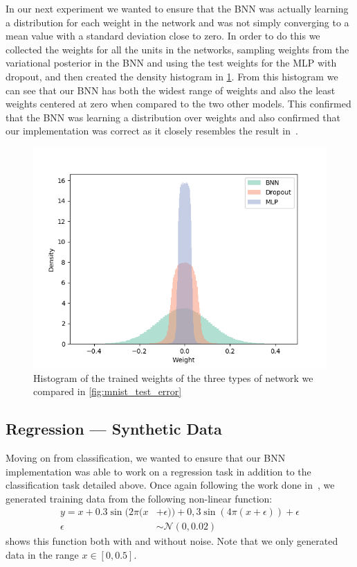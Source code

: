 \documentclass[11pt]{article}
\begin{document}
In our next experiment we wanted to ensure that the BNN was actually learning
a distribution for each weight in the network and was not simply converging to
a mean value with a standard deviation close to zero. In order to do this we
collected the weights for all the units in the networks, sampling weights from
the variational posterior in the BNN and using the test weights for the MLP
with dropout, and then created the density histogram in
\cref{fig:mnist_weight_density}. From this histogram we can see that our BNN
has both the widest range of weights and also the least weights centered at
zero when compared to the two other models. This confirmed that the BNN was
learning a distribution over weights and also confirmed that our implementation
was correct as it closely resembles the result in~\cite{blundell}.

\begin{figure}
  \centering
  \includegraphics[width=.6\textwidth]{figures/weight_density_compare.png}
  \caption{Histogram of the trained weights of the three types of network we
  compared in \cref{fig:mnist_test_error}}\label{fig:mnist_weight_density}
\end{figure}

\subsection{Regression --- Synthetic Data}

Moving on from classification, we wanted to ensure that our BNN implementation
was able to work on a regression task in addition to the classification task
detailed above. Once again following the work done in~\cite{blundell}, we
generated training data from the following non-linear function:
%
\begin{align*}
  y = x + 0.3 \sin(2\pi (x &+ \epsilon)) + 0,3 \sin(4\pi (x + \epsilon))
  + \epsilon \\
  \epsilon &\sim \mathcal{N}(0, 0.02)
\end{align*}
%
 shows this function both with and without noise.  Note
that we only generated data in the range $x\in [0, 0.5]$.
\end{document}
